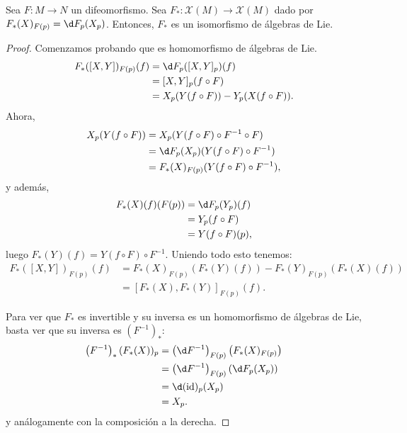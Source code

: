 \begin{nprop}
  Sea $F:M\to N$ un difeomorfismo. Sea $F_{*}:\mathscr{X}(M)\to
  \mathscr{X}(M)$ dado por $F_{*}(X)_{F(p)} = \d F_{p}(X_{p})$. Entonces,
  $F_{*}$ es un isomorfismo de álgebras de Lie.
\end{nprop}
\begin{proof}
  Comenzamos probando que es homomorfismo de álgebras de Lie.
  \begin{align*}
    F_{*}([X,Y])_{F(p)}(f) & = \d F_{p}([X,Y]_{p})(f) \\
                           & = [X,Y]_{p}(f\circ F) \\
                           & = X_{p}(Y(f\circ F)) - Y_{p}(X(f\circ F)).
  \end{align*}
  Ahora,
  \begin{align*}
    X_{p}(Y(f\circ F)) & = X_{p}(Y(f\circ F)\circ F^{-1} \circ F) \\
                       & = \d F_{p}(X_{p})(Y(f\circ F)\circ F^{-1}) \\
    & = F_{*}(X)_{F(p)}(Y(f\circ F)\circ F^{-1}),
  \end{align*}
  y además,
  \begin{align*}
    F_{*}(X)(f)(F(p)) & = \d F_{p} (Y_{p})(f) \\
                      & = Y_{p}(f\circ F) \\
                      & = Y(f\circ F)(p),
  \end{align*}
  luego $F_{*}(Y)(f) = Y(f\circ F)\circ F^{-1}$. Uniendo todo esto tenemos:
  \begin{align*}
    F_{*}([X,Y])_{F(p)}(f) & = F_{*}(X)_{F(p)}(F_{*}(Y)(f)) -
                             F_{*}(Y)_{F(p)}(F_{*}(X)(f)) \\
                           & = [F_{*}(X), F_{*}(Y)]_{F(p)}(f).
  \end{align*}

  Para ver que $F_{*}$ es invertible y su inversa es un homomorfismo de álgebras
  de Lie, basta ver que su inversa es $\left( F^{-1} \right)_{*}$:
  \begin{align*}
    \left( F^{-1} \right)_{*}(F_{*}(X))_{p} & = \left( \d F^{-1}
                                              \right)_{F(p)}\left(
                                              F_{*}(X)_{F(p)} \right) \\
                                            & = \left( \d F^{-1} \right)_{F(p)}\left( \d F_{p}(X_{p}) \right) \\
                                            & = \d (\mathrm{id})_{p} (X_{p}) \\
                                            & = X_{p}.
  \end{align*}
  y análogamente con la composición a la derecha.
\end{proof}

